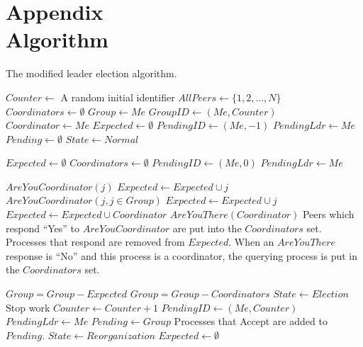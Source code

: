 \chapter[Appendix]{Appendix\\Algorithm}

The modified leader election algorithm.

\begin{algorithmic}[1]
\small
\State $Counter \gets$ A random initial identifier
\State $AllPeers \gets \{ 1, 2, ..., N \}$
\State $Coordinators \gets \emptyset$
\State $Group \gets { Me }$
\State $GroupID \gets (Me,Counter)$
\State $Coordinator \gets Me$
\State $Expected \gets \emptyset$
\State $PendingID \gets (Me, -1)$
\State $PendingLdr \gets Me$
\State $Pending \gets \emptyset$
\State $State \gets Normal$

\State

    \State $Expected \gets \emptyset$
    \State $Coordinators \gets \emptyset$
    \State $PendingID \gets (Me, 0)$
    \State $PendingLdr \gets Me$

        \State $AreYouCoordinator(j)$
        \State $Expected \gets Expected \cup j$
    \EndFor
    \Else
                \State $AreYouCoordinator(j, j \in Group)$
                \State $Expected \gets Expected \cup j$
            \EndIf
        \EndFor
        \State $Expected \gets Expected \cup Coordinator$
        \State $AreYouThere(Coordinator)$
    \EndIf
    \State Peers which respond ``Yes'' to $AreYouCoordinator$ are put into the $Coordinators$ set.
    \State Processes that respond are removed from $Expected$.
    \State When an $AreYouThere$ response is ``No'' and this process is a coordinator, the querying process is put in the $Coordinators$ set.
\EndFunction

\State

        \State $Group = Group - Expected$
        \State $Group = Group - Coordinators$
    \EndIf
        \State $State \gets Election$
        \State Stop work
        \State $Counter \gets Counter+1$
        \State $PendingID \gets (Me,Counter)$
        \State $PendingLdr \gets Me$
        \State $Pending \gets Group$
        \EndFor
        \State Processes that Accept are added to $Pending$.
        \State $State \gets Reorganization$
    \EndIf
    \State $Expected \gets \emptyset$
\EndFunction


\end{algorithmic}
